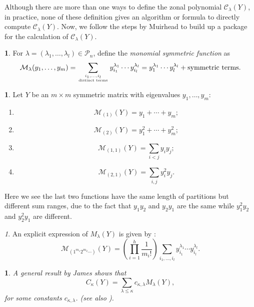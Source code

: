 \documentclass[10pt,oneside,american]{amsart}
\numberwithin{equation}{section}
\numberwithin{figure}{section}
\theoremstyle{definition}
\newtheorem{defn}{\protect\definitionname}[section]
\theoremstyle{remark}
\newtheorem{rem}{\protect\remarkname}[section]
\theoremstyle{plain}
\theoremstyle{definition}
\newtheorem{example}{\protect\examplename}[section]
\theoremstyle{plain}
\newtheorem{thm}{\protect\theoremname}[section]
\theoremstyle{plain}
\theoremstyle{plain}
\providecommand{\definitionname}{Definition}
\providecommand{\examplename}{Example}
\providecommand{\remarkname}{Remark}
\providecommand{\theoremname}{Theorem}
\begin{document}
Although there are more than one ways to define the zonal polynomial $\mathcal{C}_{\lambda}(Y)$,
in practice, none of these definition gives an algorithm or formula
to directly compute $\mathcal{C}_{\lambda}(Y)$. Now, we
follow the steps by Muirhead \cite{Muirhead} to build up a package for the
calculation of $\mathcal{C}_{\lambda}(Y)$.
\begin{defn}
For $\lambda=\left(\lambda_{1},\ldots,\lambda_{l}\right)\in\mathcal{P}_{n}$,
define the \emph{monomial symmetric function} as 
\begin{equation}
\mathcal{M}_{\lambda}(y_{1},\ldots,y_{m})=\sum_{\genfrac{}{}{0pt}{}{i_{1},\ldots,i_{l}}{\text{distinct terms}}}y_{i_{1}}^{\lambda_{1}}\cdots y_{i_{l}}^{\lambda_{l}}=y_{1}^{\lambda_{1}}\cdots y_{l}^{\lambda_{l}}+\text{symmetric terms}.\label{eq:MZonal}
\end{equation}
\end{defn}
\begin{example}
Let $Y$ be an $m\times m$ symmetric matrix with eigenvalues $y_{1},\ldots,y_{m}$:
\begin{enumerate}
\item 
\[
\mathcal{M}_{\left(1\right)}(Y)=y_{1}+\cdots+y_{m};
\]
\item 
\[
\mathcal{M}_{\left(2\right)}(Y)=y_{1}^{2}+\cdots+y_{m}^{2};
\]
\item \label{enu:ILessThanJ}
\[
\mathcal{M}_{\left(1,1\right)}(Y)=\underset{i<j}{\sum}y_{i}y_{j};
\]
\item \label{enu:IANDJ}
\[
\mathcal{M}_{\left(2,1\right)}(Y)=\underset{i,j}{\sum}y_{i}^{2}y_{j}.
\]
\end{enumerate}
Here we see the last two functions have the same length of partitions
but different sum ranges, due to the fact that $y_{1}y_{2}$ and $y_{2}y_{1}$
are the same while $y_{1}^{2}y_{2}$ and $y_{2}^{2}y_{1}$ are different. 
\end{example}
\begin{rem}
An explicit expression of $M_{\lambda}(Y)$ is given by
\cite[pp.~11, eq.~6]{Takemura}:
\begin{equation}
\mathcal{M}_{\left(1^{m_{1}}2^{m_{2}}\cdots\right)}\left(Y\right)=\left(\prod_{i=1}^{h}\frac{1}{m_{i}!}\right)\sum_{i_{1},\ldots,i_{l}}y_{i_{1}}^{\lambda_{1}}\cdots y_{i_{l}}^{\lambda_{l}}.\label{eq:MZonalComputation}
\end{equation}
\end{rem}
\begin{thm}
A general result by James \cite{James1} shows that
\begin{equation}
C_{\kappa}(Y)=\sum_{\lambda\leq\kappa}c_{\kappa,\lambda}M_{\lambda}(Y),\label{eq:CInTermsOfM}
\end{equation}
 for some constants $c_{\kappa,\lambda}$. (see also \cite[pp.~234, eq.~13]{Muirhead}).
\end{thm}
\end{document}

